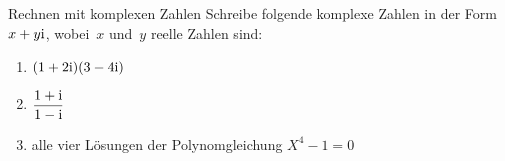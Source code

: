 \documentclass{algblatt}
\begin{document}
\begin{aufgabe}{Rechnen mit komplexen Zahlen}
Schreibe folgende komplexe Zahlen in der Form~$x + y \mathrm{i}$, wobei~$x$ und~$y$
reelle Zahlen sind:
\begin{enumerate}
\item $(1 + 2 \mathrm{i}) (3 - 4 \mathrm{i})$
\item $\dfrac{1 + \mathrm{i}}{1 - \mathrm{i}}$
\item alle vier Lösungen der Polynomgleichung $X^4 - 1 = 0$
\end{enumerate}
\end{aufgabe}
\end{document}
